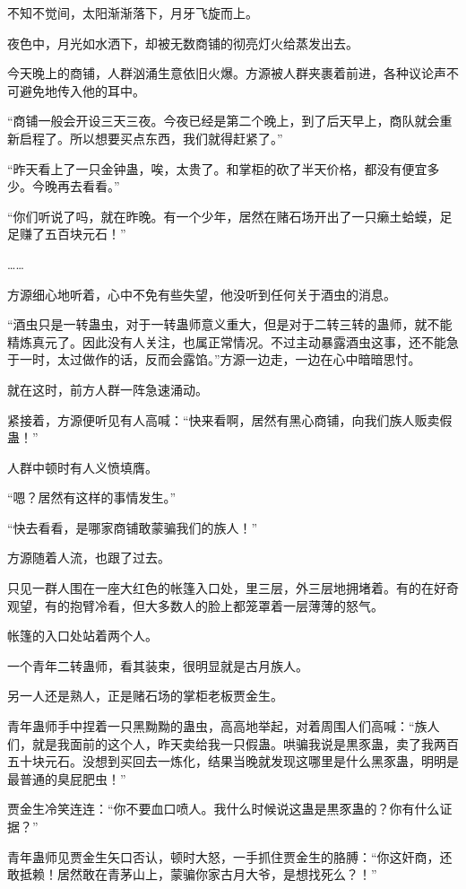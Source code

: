 \begin{this_body}
不知不觉间，太阳渐渐落下，月牙飞旋而上。

夜色中，月光如水洒下，却被无数商铺的彻亮灯火给蒸发出去。

今天晚上的商铺，人群汹涌生意依旧火爆。方源被人群夹裹着前进，各种议论声不可避免地传入他的耳中。

“商铺一般会开设三天三夜。今夜已经是第二个晚上，到了后天早上，商队就会重新启程了。所以想要买点东西，我们就得赶紧了。”

“昨天看上了一只金钟蛊，唉，太贵了。和掌柜的砍了半天价格，都没有便宜多少。今晚再去看看。”

“你们听说了吗，就在昨晚。有一个少年，居然在赌石场开出了一只癞土蛤蟆，足足赚了五百块元石！”

……

方源细心地听着，心中不免有些失望，他没听到任何关于酒虫的消息。

“酒虫只是一转蛊虫，对于一转蛊师意义重大，但是对于二转三转的蛊师，就不能精炼真元了。因此没有人关注，也属正常情况。不过主动暴露酒虫这事，还不能急于一时，太过做作的话，反而会露馅。”方源一边走，一边在心中暗暗思忖。

就在这时，前方人群一阵急速涌动。

紧接着，方源便听见有人高喊：“快来看啊，居然有黑心商铺，向我们族人贩卖假蛊！”

人群中顿时有人义愤填膺。

“嗯？居然有这样的事情发生。”

“快去看看，是哪家商铺敢蒙骗我们的族人！”

方源随着人流，也跟了过去。

只见一群人围在一座大红色的帐篷入口处，里三层，外三层地拥堵着。有的在好奇观望，有的抱臂冷看，但大多数人的脸上都笼罩着一层薄薄的怒气。

帐篷的入口处站着两个人。

一个青年二转蛊师，看其装束，很明显就是古月族人。

另一人还是熟人，正是赌石场的掌柜老板贾金生。

青年蛊师手中捏着一只黑黝黝的蛊虫，高高地举起，对着周围人们高喊：“族人们，就是我面前的这个人，昨天卖给我一只假蛊。哄骗我说是黒豕蛊，卖了我两百五十块元石。没想到买回去一炼化，结果当晚就发现这哪里是什么黑豕蛊，明明是最普通的臭屁肥虫！”

贾金生冷笑连连：“你不要血口喷人。我什么时候说这蛊是黒豕蛊的？你有什么证据？”

青年蛊师见贾金生矢口否认，顿时大怒，一手抓住贾金生的胳膊：“你这奸商，还敢抵赖！居然敢在青茅山上，蒙骗你家古月大爷，是想找死么？！”


\end{this_body}
